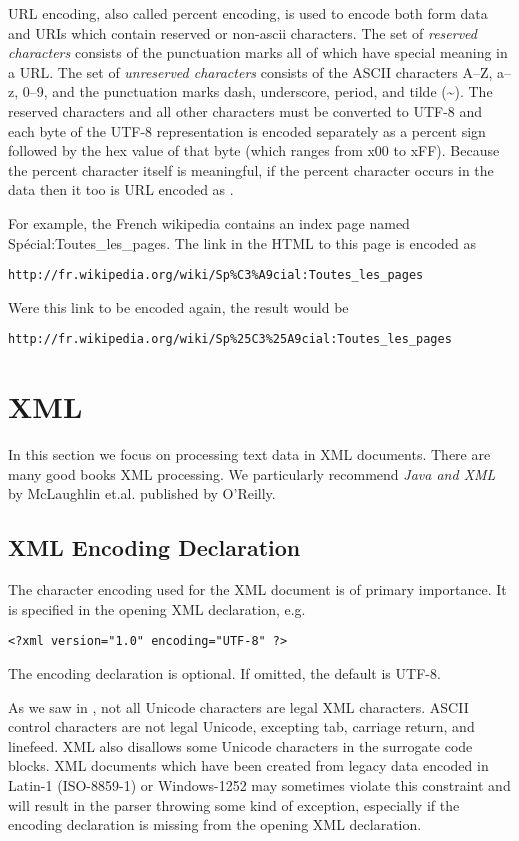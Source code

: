 URL encoding, also called percent encoding, is used to encode both form data and URIs which
contain reserved or non-ascii characters.
The set of \emph{reserved characters} consists of the punctuation marks
\mbox{}
all of which have special meaning in a URL.
The set of \emph{unreserved characters} consists of the ASCII characters A--Z, a--z, 0--9,
and the punctuation marks dash, underscore, period, and tilde (\textasciitilde{}).
The reserved characters and all other characters must be converted to UTF-8
and each byte of the UTF-8 representation
is encoded separately as a percent sign followed by the hex value of that byte
(which ranges from {\bk}x00 to {\bk}xFF).
Because the percent character itself is meaningful, if the percent character occurs in the
data then it too is URL encoded as .

For example, the French wikipedia contains an index page named \mbox{Sp{\'e}cial:Toutes\_les\_pages}.
The link in the HTML to this page is encoded as
\begin{verbatim}
http://fr.wikipedia.org/wiki/Sp%C3%A9cial:Toutes_les_pages
\end{verbatim}
Were this link to be encoded again, the result would be
\begin{verbatim}
http://fr.wikipedia.org/wiki/Sp%25C3%25A9cial:Toutes_les_pages
\end{verbatim}


\section{XML}

In this section we focus on processing text data in XML documents.
There are many good books XML processing.
We particularly recommend \emph{Java and XML} by McLaughlin et.al.
published by O'Reilly.

\subsection{XML Encoding Declaration}

The character encoding used for the XML document is of primary importance.
It is specified in the opening XML declaration, e.g.
\begin{verbatim} 
<?xml version="1.0" encoding="UTF-8" ?>
\end{verbatim} 
The encoding declaration is optional.  If omitted, the default is UTF-8.

As we saw in , not all Unicode characters are legal XML characters.
ASCII control characters are not legal Unicode, excepting tab, carriage return, and linefeed.
XML also disallows some Unicode characters in the surrogate code blocks.
XML documents which have been created from legacy data encoded in Latin-1 (ISO-8859-1)
or Windows-1252 may sometimes violate this constraint and will result in the parser
throwing some kind of exception, especially if the encoding declaration is missing
from the opening XML declaration.



